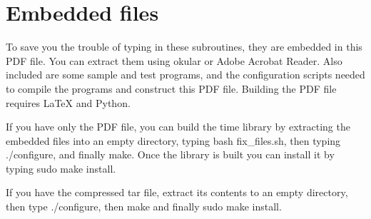 \documentclass[letterpaper,twoside]{article}
\begin{document}
\section{Embedded files}
\label{section:Embedded_files}
To save you the trouble of typing in these subroutines, they are embedded
in this PDF file.  You can extract them using okular or Adobe Acrobat Reader.
Also included are some sample and test programs, and the configuration
scripts needed to compile the programs and construct this PDF file.
Building the PDF file requires {\LaTeX} and Python.

If you have only the PDF file, you can build the time library by
extracting the embedded files into an empty directory,
typing {\ttfamily bash fix\_files.sh}, 
then typing {\ttfamily ./configure},
and finally {\ttfamily make}.
Once the library is built you can install it by typing
{\ttfamily sudo make install}.

If you have the compressed tar file, extract its contents to an empty
directory, then type {\ttfamily ./configure},
then {\ttfamily make} and finally {\ttfamily sudo make install}.
\end{document}
